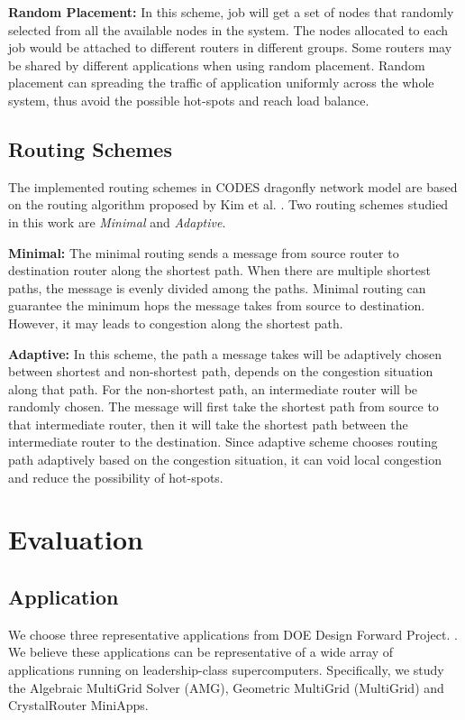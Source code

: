\documentclass[conference,compsoc]{IEEEtran}
\begin{document}
\textbf{Random Placement:} In this scheme, job will get a set of nodes that randomly selected from all the available nodes in the system. The nodes allocated to each job would be attached to different routers in different groups. Some routers may be shared by different applications when using random placement. Random placement can spreading the traffic of application uniformly across the whole system, thus avoid the possible hot-spots and reach load balance.


\subsection{Routing Schemes}
\label{sec:routing}

The implemented routing schemes in CODES dragonfly network model are based on the routing algorithm proposed by Kim et al. \cite{dally-dragonfly}. Two routing schemes studied in this work are \emph{Minimal} and \emph{Adaptive}.

\textbf{Minimal:} The minimal routing sends a message from source router to destination router along the shortest path. When there are multiple shortest paths, the message is evenly divided among the paths. Minimal routing can guarantee the minimum hops the message takes from source to destination. However, it may leads to congestion along the shortest path. 


\textbf{Adaptive:} In this scheme, the path a message takes will be adaptively chosen between shortest and non-shortest path, depends on the congestion situation along that path. For the non-shortest path, an intermediate router will be randomly chosen. The message will first take the shortest path from source to that intermediate router, then it will take the shortest path between the intermediate router to the destination. Since adaptive scheme chooses routing path adaptively based on the congestion situation, it can void local congestion and reduce the possibility of hot-spots. 


\section{Evaluation}
\label{sec:evaluation}

\subsection{Application}
\label{sec:app study}

We choose three representative applications from DOE Design Forward Project\cite{designforwardwebpage}. . We believe these applications can be representative of a wide array of applications running on leadership-class supercomputers. Specifically, we study the Algebraic MultiGrid Solver (AMG), Geometric MultiGrid (MultiGrid) and CrystalRouter MiniApps. 
\end{document}
